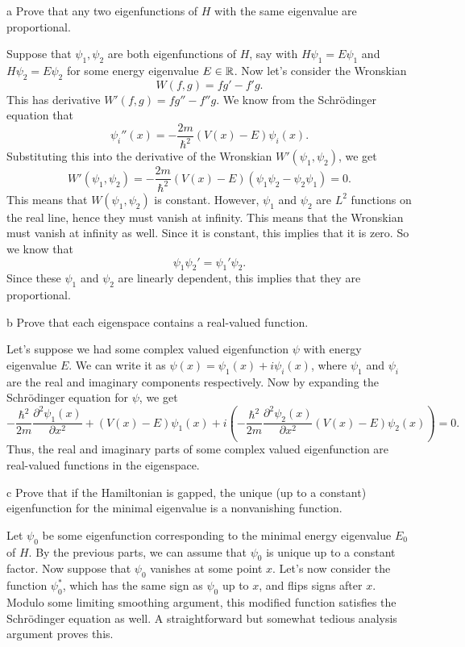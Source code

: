 \documentclass{pset}
\begin{document}
\begin{parts}
  \begin{part}{a}
    Prove that any two eigenfunctions of $H$ with the same eigenvalue are proportional. %
  \end{part}

  Suppose that $\psi_1, \psi_2$ are both eigenfunctions of $H$, say with $H\psi_1 = E\psi_1$ and $H\psi_2 = E\psi_2$ for some energy eigenvalue $E\in \mathbb{R}$. Now let's consider the Wronskian
  \[
    W(f,g) = fg' - f'g.
  \]
  This has derivative $W'(f,g) = fg'' - f''g$. We know from the Schr\"odinger equation that 
  \[
    \psi_i''(x) = -\frac{2m}{\hbar^2}(V(x) - E)\psi_i(x).
  \]
  Substituting this into the derivative of the Wronskian $W'(\psi_1, \psi_2)$, we get
  \[
    W'(\psi_1, \psi_2) = -\frac{2m}{\hbar^2}(V(x)-E)(\psi_1\psi_2 - \psi_2\psi_1) = 0.
  \]
  This means that $W(\psi_1, \psi_2)$ is constant. However, $\psi_1$ and $\psi_2$ are $L^2$ functions on the real line, hence they must vanish at infinity. This means that the Wronskian must vanish at infinity as well. Since it is constant, this implies that it is zero. So we know that
  \[
    \psi_1\psi_2' = \psi_1'\psi_2.
  \]
  Since these $\psi_1$ and $\psi_2$ are linearly dependent, this implies that they are proportional.

  \begin{part}{b}
    Prove that each eigenspace contains a real-valued function.
  \end{part}

  Let's suppose we had some complex valued eigenfunction $\psi$ with energy eigenvalue $E$. We can write it as $\psi(x) = \psi_1(x) + i\psi_i(x)$, where $\psi_1$ and $\psi_i$ are the real and imaginary components respectively. Now by expanding the Schr\"odinger equation for $\psi$, we get
  \[
    -\frac{\hbar^2}{2m}\frac{\partial^2\psi_1(x)}{\partial x^2} + (V(x) - E)\psi_1(x) + i\left(-\frac{\hbar^2}{2m}\frac{\partial^2\psi_2(x)}{\partial x^2}  (V(x) - E)\psi_2(x)\right) = 0.
  \]
  Thus, the real and imaginary parts of some complex valued eigenfunction are real-valued functions in the eigenspace.

  \begin{part}{c}
    Prove that if the Hamiltonian is gapped, the unique (up to a constant) eigenfunction for the minimal eigenvalue is a nonvanishing function.
  \end{part}

  Let $\psi_0$ be some eigenfunction corresponding to the minimal energy eigenvalue $E_0$ of $H$. By the previous parts, we can assume that $\psi_0$ is unique up to a constant factor. Now suppose that $\psi_0$ vanishes at some point $x$. Let's now consider the function $\psi_0^*$, which has the same sign as $\psi_0$ up to $x$, and flips signs after $x$. Modulo some limiting smoothing argument, this modified function satisfies the Schr\"odinger equation as well. A straightforward but somewhat tedious analysis argument proves this.
\end{parts}
\end{document}

